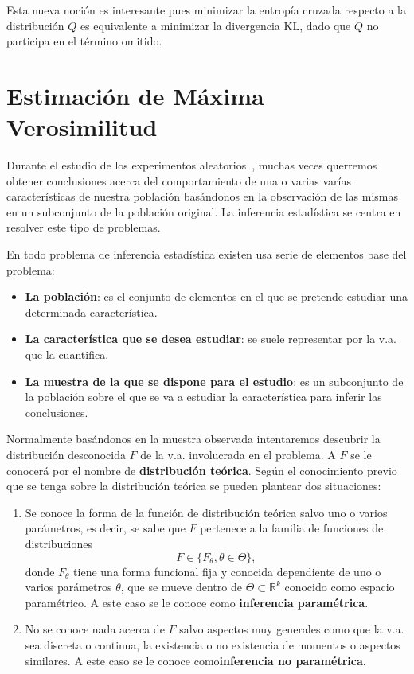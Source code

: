 Esta nueva noción es interesante pues minimizar la entropía cruzada respecto a la distribución $Q$ es equivalente a minimizar la divergencia KL, dado que $Q$ no participa en el término omitido.

\section{Estimación de Máxima Verosimilitud}
Durante el estudio de los experimentos aleatorios~\cite{garthwaite-2002}, muchas veces querremos obtener conclusiones acerca del comportamiento de una o varias varías características de nuestra población basándonos en la observación de las mismas en un subconjunto de la población original. La inferencia estadística se centra en resolver este tipo de problemas.

En todo problema de inferencia estadística existen usa serie de elementos base del problema:
\begin{itemize}
    \item \textbf{La población}: es el conjunto de elementos en el que se pretende estudiar una determinada característica.
    \item \textbf{La característica que se desea estudiar}: se suele representar por la \ac{v.a.} que la cuantifica.
    \item \textbf{La muestra de la que se dispone para el estudio}: es un subconjunto de la población sobre el que se va a estudiar la característica para inferir las conclusiones.
\end{itemize}

Normalmente basándonos en la muestra observada intentaremos descubrir la distribución desconocida $F$ de la \ac{v.a.} involucrada en el problema. A $F$ se le conocerá por el nombre de \textbf{distribución teórica}. Según el conocimiento previo que se tenga sobre la distribución teórica se pueden plantear dos situaciones:

\begin{enumerate}
    \item Se conoce la forma de la función de distribución teórica salvo uno o varios parámetros, es decir, se sabe que $F$ pertenece a la familia de funciones de distribuciones
    \begin{equation}
        F \in \{ F_\theta, \theta \in \Theta \},
    \end{equation}
    donde $F_\theta$ tiene una forma funcional fija y conocida dependiente de uno o varios parámetros $\theta$, que se mueve dentro de $\Theta \subset \mathbb{R}^k$ conocido como espacio paramétrico. A este caso se le conoce como \textbf{inferencia paramétrica}.
    \item No se conoce nada acerca de $F$ salvo aspectos muy generales como que la \ac{v.a.} sea discreta o continua, la existencia o no existencia de momentos o aspectos similares. A este caso se le conoce como\textbf{inferencia no paramétrica}.
\end{enumerate}

